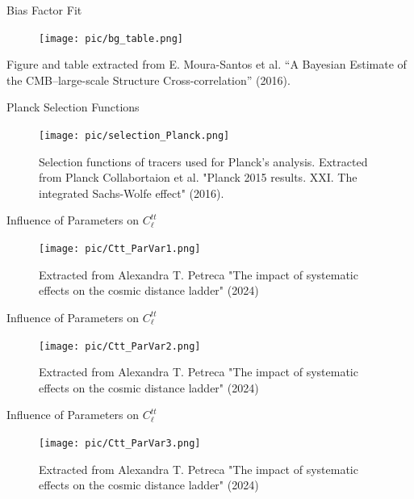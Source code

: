 \documentclass[serif, aspectratio=169]{beamer}
\begin{document}
\begin{frame}{Bias Factor Fit}
	\begin{figure}
	\centering
	\texttt{[image: pic/bg\_table.png]}
	\end{figure}
	
	Figure and table extracted from E. Moura-Santos et al. “A Bayesian Estimate of the CMB–large-scale Structure Cross-correlation” (2016).
\end{frame}

\begin{frame}{Planck Selection Functions}
	\begin{figure}
	\centering
	\texttt{[image: pic/selection\_Planck.png]}
	\caption{Selection functions of tracers used for Planck's analysis. Extracted from Planck Collabortaion et al. "Planck 2015 results. XXI. The integrated Sachs-Wolfe effect" (2016).}
	\end{figure}
\end{frame}

\begin{frame}{Influence of Parameters on $C_\ell^{tt}$}
	\begin{figure}
	\centering
	\texttt{[image: pic/Ctt\_ParVar1.png]}
	\caption{Extracted from Alexandra T. Petreca "The impact of systematic effects on the cosmic distance ladder" (2024)}
	\label{fig:ParVar1}
	\end{figure}
\end{frame}

\begin{frame}{Influence of Parameters on $C_\ell^{tt}$}
	\begin{figure}
	\centering
	\texttt{[image: pic/Ctt\_ParVar2.png]}
	\caption{Extracted from Alexandra T. Petreca "The impact of systematic effects on the cosmic distance ladder" (2024)}
	\label{fig:ParVar2}
	\end{figure}
\end{frame}

\begin{frame}{Influence of Parameters on $C_\ell^{tt}$}
	\begin{figure}
	\centering
	\texttt{[image: pic/Ctt\_ParVar3.png]}
	\caption{Extracted from Alexandra T. Petreca "The impact of systematic effects on the cosmic distance ladder" (2024)}
	\label{fig:ParVar3}
	\end{figure}
\end{frame}
\end{document}

